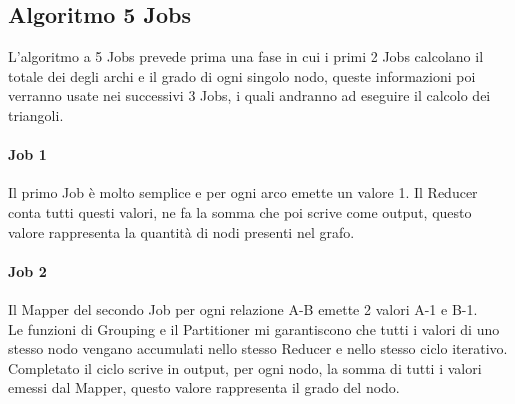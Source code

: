 \documentclass[paper=a4, fontsize=11pt]{scrartcl}	%
\numberwithin{equation}{section}															%
\numberwithin{figure}{section}																%
\numberwithin{table}{section}																%
\begin{document}
\subsection{Algoritmo 5 Jobs}
L'algoritmo a 5 Jobs prevede prima una fase in cui i primi 2 Jobs calcolano il totale dei degli archi e il grado di ogni singolo nodo, queste informazioni poi verranno usate nei successivi 3 Jobs, i quali andranno ad eseguire il calcolo dei triangoli.
\paragraph{Job 1}
Il primo Job è molto semplice e per ogni arco emette un valore 1. Il Reducer conta tutti questi valori, ne fa la somma che poi scrive come output, questo valore rappresenta la quantità di nodi presenti nel grafo.
\paragraph{Job 2}
Il Mapper del secondo Job per ogni relazione A-B emette 2 valori A-1 e B-1.\\
Le funzioni di Grouping e il Partitioner mi garantiscono che tutti i valori di uno stesso nodo vengano accumulati nello stesso Reducer e nello stesso ciclo iterativo. Completato il ciclo scrive in output, per ogni nodo, la somma di tutti i valori emessi dal Mapper, questo valore rappresenta il grado del nodo.
\end{document}
